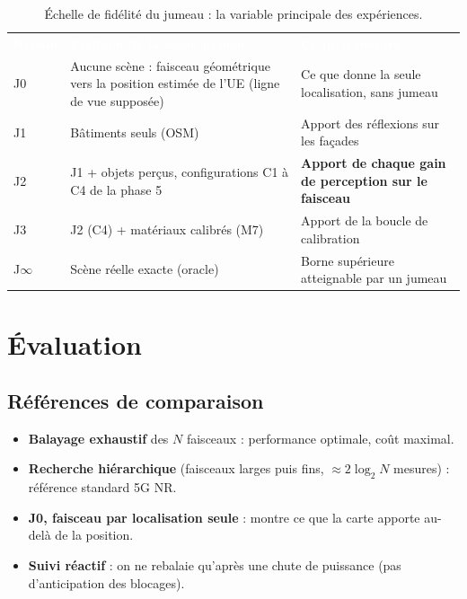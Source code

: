 \documentclass[11pt,a4paper]{article}
\newcommand{\hd}[1]{\textcolor{white}{\textbf{#1}}}
\begin{document}
\begin{table}[H]
\centering
\caption{Échelle de fidélité du jumeau : la variable principale des expériences.}
\label{tab:fidelite}
\begin{tabularx}{\linewidth}{B{1.2cm} P{4.4cm} L}
\hd{Niveau} & \hd{Contenu de la scène jumelle} & \hd{Ce qu'il mesure} \\
J0 & Aucune scène : faisceau géométrique vers la position estimée de l'UE (ligne de vue supposée) & Ce que donne la seule localisation, sans jumeau \\
J1 & Bâtiments seuls (OSM) & Apport des réflexions sur les façades \\
J2 & J1 + objets perçus, configurations C1 à C4 de la phase 5 & \textbf{Apport de chaque gain de perception sur le faisceau} \\
J3 & J2 (C4) + matériaux calibrés (M7) & Apport de la boucle de calibration \\
J$\infty$ & Scène réelle exacte (oracle) & Borne supérieure atteignable par un jumeau \\
\end{tabularx}
\end{table}

\section{Évaluation}

\subsection{Références de comparaison}
\begin{itemize}
  \item \textbf{Balayage exhaustif} des $N$ faisceaux : performance optimale, coût maximal.
  \item \textbf{Recherche hiérarchique} (faisceaux larges puis fins, $\approx 2\log_2 N$ mesures) :
        référence standard 5G NR.
  \item \textbf{J0, faisceau par localisation seule} : montre ce que la carte apporte au-delà de
        la position.
  \item \textbf{Suivi réactif} : on ne rebalaie qu'après une chute de puissance (pas d'anticipation
        des blocages).
\end{itemize}
\end{document}
